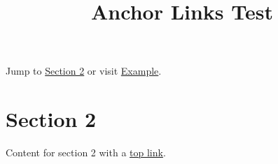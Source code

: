 \documentclass[11pt,a4paper]{article}
\title{Anchor Links Test}
\begin{document}
\maketitle

Jump to \href{\#section-2}{Section 2} or visit \href{https://example.com/}{Example}.

\section{Section 2}

Content for section 2 with a \href{\#}{top link}.
\end{document}

